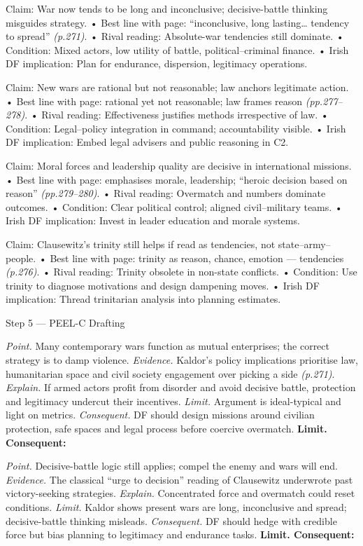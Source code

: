 Claim: War now tends to be long and inconclusive; decisive-battle thinking misguides strategy.
• Best line with page: “inconclusive, long lasting… tendency to spread” \emph{(p.271)}.
• Rival reading: Absolute-war tendencies still dominate.
• Condition: Mixed actors, low utility of battle, political–criminal finance.
• Irish DF implication: Plan for endurance, dispersion, legitimacy operations.

Claim: New wars are rational but not reasonable; law anchors legitimate action.
• Best line with page: rational yet not reasonable; law frames reason \emph{(pp.277–278)}.
• Rival reading: Effectiveness justifies methods irrespective of law.
• Condition: Legal–policy integration in command; accountability visible.
• Irish DF implication: Embed legal advisers and public reasoning in C2.

Claim: Moral forces and leadership quality are decisive in international missions.
• Best line with page: emphasises morale, leadership; “heroic decision based on reason” \emph{(pp.279–280)}.
• Rival reading: Overmatch and numbers dominate outcomes.
• Condition: Clear political control; aligned civil–military teams.
• Irish DF implication: Invest in leader education and morale systems.

Claim: Clausewitz’s trinity still helps if read as tendencies, not state–army–people.
• Best line with page: trinity as reason, chance, emotion — tendencies \emph{(p.276)}.
• Rival reading: Trinity obsolete in non-state conflicts.
• Condition: Use trinity to diagnose motivations and design dampening moves.
• Irish DF implication: Thread trinitarian analysis into planning estimates.

Step 5 — PEEL-C Drafting

\textit{Point.} Many contemporary wars function as mutual enterprises; the correct strategy is to damp violence.
\textit{Evidence.} Kaldor’s policy implications prioritise law, humanitarian space and civil society engagement over picking a side \emph{(p.271)}.
\textit{Explain.} If armed actors profit from disorder and avoid decisive battle, protection and legitimacy undercut their incentives.
\textit{Limit.} Argument is ideal-typical and light on metrics.
\textit{Consequent.} DF should design missions around civilian protection, safe spaces and legal process before coercive overmatch. \textbf{Limit. Consequent:}

\textit{Point.} Decisive-battle logic still applies; compel the enemy and wars will end.
\textit{Evidence.} The classical “urge to decision” reading of Clausewitz underwrote past victory-seeking strategies.
\textit{Explain.} Concentrated force and overmatch could reset conditions.
\textit{Limit.} Kaldor shows present wars are long, inconclusive and spread; decisive-battle thinking misleads.
\textit{Consequent.} DF should hedge with credible force but bias planning to legitimacy and endurance tasks. \textbf{Limit. Consequent:}

